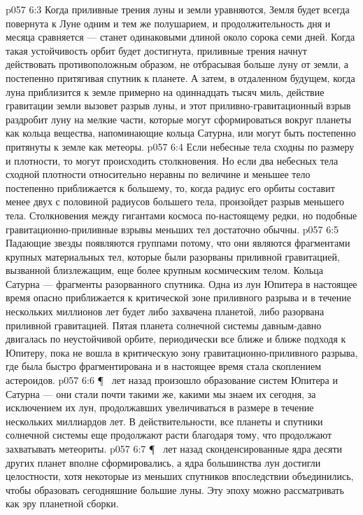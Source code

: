 \vs p057 6:3 Когда приливные трения луны и земли уравняются, Земля будет всегда повернута к Луне одним и тем же полушарием, и продолжительность дня и месяца сравняется --- станет одинаковыми длиной около сорока семи дней. Когда такая устойчивость орбит будет достигнута, приливные трения начнут действовать противоположным образом, не отбрасывая больше луну от земли, а постепенно притягивая спутник к планете. А затем, в отдаленном будущем, когда луна приблизится к земле примерно на одиннадцать тысяч миль, действие гравитации земли вызовет разрыв луны, и этот приливно\hyp{}гравитационный взрыв раздробит луну на мелкие части, которые могут сформироваться вокруг планеты как кольца вещества, напоминающие кольца Сатурна, или могут быть постепенно притянуты к земле как метеоры.
\vs p057 6:4 Если небесные тела сходны по размеру и плотности, то могут происходить столкновения. Но если два небесных тела сходной плотности относительно неравны по величине и меньшее тело постепенно приближается к большему, то, когда радиус его орбиты составит менее двух с половиной радиусов большего тела, произойдет разрыв меньшего тела. Столкновения между гигантами космоса по\hyp{}настоящему редки, но подобные гравитационно\hyp{}приливные взрывы меньших тел достаточно обычны.
\vs p057 6:5 Падающие звезды появляются группами потому, что они являются фрагментами крупных материальных тел, которые были разорваны приливной гравитацией, вызванной близлежащим, еще более крупным космическим телом. Кольца Сатурна --- фрагменты разорванного спутника. Одна из лун Юпитера в настоящее время опасно приближается к критической зоне приливного разрыва и в течение нескольких миллионов лет будет либо захвачена планетой, либо разорвана приливной гравитацией. Пятая планета солнечной системы давным\hyp{}давно двигалась по неустойчивой орбите, периодически все ближе и ближе подходя к Юпитеру, пока не вошла в критическую зону гравитационно\hyp{}приливного разрыва, где была быстро фрагментирована и в настоящее время стала скоплением астероидов.
\vs p057 6:6 \P\  лет назад произошло образование систем Юпитера и Сатурна --- они стали почти такими же, какими мы знаем их сегодня, за исключением их лун, продолжавших увеличиваться в размере в течение нескольких миллиардов лет. В действительности, все планеты и спутники солнечной системы еще продолжают расти благодаря тому, что продолжают захватывать метеориты.
\vs p057 6:7 \P\  лет назад сконденсированные ядра десяти других планет вполне сформировались, а ядра большинства лун достигли целостности, хотя некоторые из меньших спутников впоследствии объединились, чтобы образовать сегодняшние большие луны. Эту эпоху можно рассматривать как эру планетной сборки.
